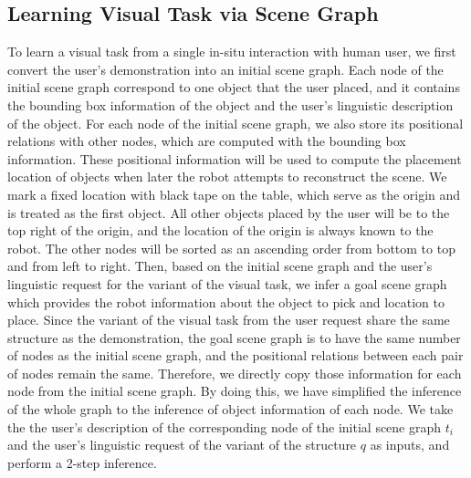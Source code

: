 \subsection{Learning Visual Task via Scene Graph}
To learn a visual task from a single in-situ interaction with human user, we first convert the user's demonstration into an initial scene graph.
Each node of the initial scene graph correspond to one object that the user placed, and it contains the bounding box information of the object and the user's linguistic description of the object.
For each node of the initial scene graph, we also store its positional relations with other nodes, which are computed with the bounding box information.
These positional information will be used to compute the placement location of objects when later the robot attempts to reconstruct the scene.
We mark a fixed location with black tape on the table, which serve as the origin and is treated as the first object. All other objects placed by the user will be to the top right of the origin, and the location of the origin is always known to the robot.
The other nodes will be sorted as an ascending order from bottom to top and from left to right.
%
Then, based on the initial scene graph and the user's linguistic request for the variant of the visual task, we infer a goal scene graph which provides the robot information about the object to pick and location to place.
Since the variant of the visual task from the user request share the same structure as the demonstration, the goal scene graph is to have the same number of nodes as the initial scene graph, and the positional relations between each pair of nodes remain the same.
Therefore, we directly copy those information for each node from the initial scene graph. 
By doing this, we have simplified the inference of the whole graph to the inference of object information of each node.
We take the the user's description of the corresponding node of the initial scene graph $t_i$ and the user's linguistic request of the variant of the structure $q$ as inputs, and perform a 2-step inference.
